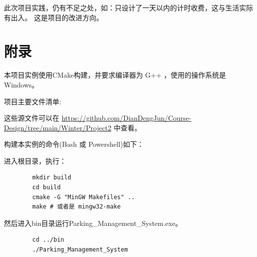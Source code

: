 \documentclass{ctexart}
\begin{document}
    此次项目实践，仍有不足之处，如：只设计了一天以内的计时收费，这与生活实际有出入。
    这是项目的改进方向。

    \section{附录}

    本项目实例使用CMake构建，并要求编译器为 G++ ，使用的操作系统是 Windows。

    项目主要文件清单:
    

    这些源文件可以在 \url{https://github.com/DianDengJun/Course-Design/tree/main/Winter/Project2} 中查看。
    
    构建本实例的命令(Bash 或 Powershell)如下：
    
    进入根目录，执行：
    
    \begin{verbatim}
        mkdir build
        cd build
        cmake -G "MinGW Makefiles" ..
        make # 或者是 mingw32-make
    \end{verbatim}

    然后进入bin目录运行Parking\_Management\_System.exe。

    \begin{verbatim}
        cd ../bin
        ./Parking_Management_System
    \end{verbatim}
\end{document}
